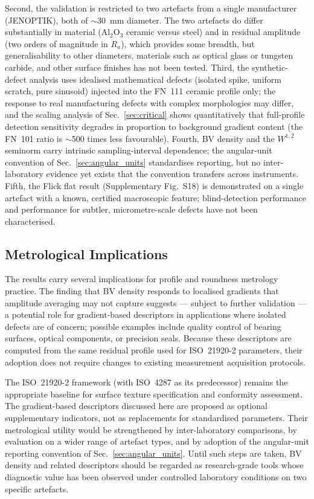 \documentclass[review]{elsarticle}
\begin{document}
Second, the validation is restricted to two artefacts from a single manufacturer (JENOPTIK), both of $\sim30$~mm diameter. The two artefacts do differ substantially in material (Al$_2$O$_3$ ceramic versus steel) and in residual amplitude (two orders of magnitude in $R_a$), which provides some breadth, but generalisability to other diameters, materials such as optical glass or tungsten carbide, and other surface finishes has not been tested. Third, the synthetic-defect analysis uses idealised mathematical defects (isolated spike, uniform scratch, pure sinusoid) injected into the FN~111 ceramic profile only; the response to real manufacturing defects with complex morphologies may differ, and the scaling analysis of Sec.~\ref{sec:critical} shows quantitatively that full-profile detection sensitivity degrades in proportion to background gradient content (the FN~101 ratio is $\sim$500 times less favourable). Fourth, BV density and the $W^{1,2}$ seminorm carry intrinsic sampling-interval dependence; the angular-unit convention of Sec.~\ref{sec:angular_units} standardises reporting, but no inter-laboratory evidence yet exists that the convention transfers across instruments. Fifth, the Flick flat result (Supplementary Fig.~S18) is demonstrated on a single artefact with a known, certified macroscopic feature; blind-detection performance and performance for subtler, micrometre-scale defects have not been characterised.

\subsection{Metrological Implications}
The results carry several implications for profile and roundness metrology practice. The finding that BV density responds to localised gradients that amplitude averaging may not capture suggests --- subject to further validation --- a potential role for gradient-based descriptors in applications where isolated defects are of concern; possible examples include quality control of bearing surfaces, optical components, or precision seals. Because these descriptors are computed from the same residual profile used for ISO~21920-2 parameters, their adoption does not require changes to existing measurement acquisition protocols.

The ISO~21920-2 framework (with ISO~4287 as its predecessor) remains the appropriate baseline for surface texture specification and conformity assessment. The gradient-based descriptors discussed here are proposed as optional supplementary indicators, not as replacements for standardised parameters. Their metrological utility would be strengthened by inter-laboratory comparisons, by evaluation on a wider range of artefact types, and by adoption of the angular-unit reporting convention of Sec.~\ref{sec:angular_units}. Until such steps are taken, BV density and related descriptors should be regarded as research-grade tools whose diagnostic value has been observed under controlled laboratory conditions on two specific artefacts.
\end{document}
